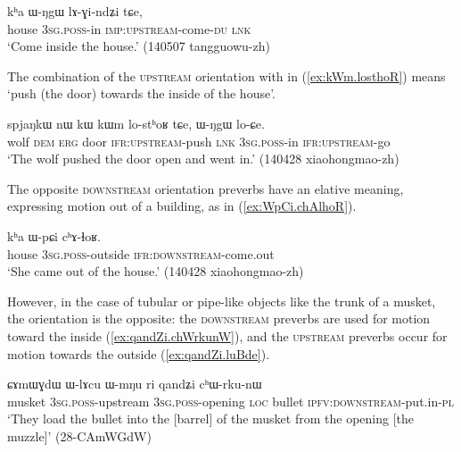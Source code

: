 \begin{exe}
\ex \label{ex:WNgW.lAGindZi}
\gll   kʰa ɯ-ŋgɯ lɤ-ɣi-ndʑi tɕe,   \\
  house  \textsc{3sg}.\textsc{poss}-in \textsc{imp}:\textsc{upstream}-come-\textsc{du} \textsc{lnk}   \\
\glt `Come inside the house.' (140507 tangguowu-zh) 
\end{exe}

The combination of the \textsc{upstream} orientation with  in (\ref{ex:kWm.losthoR}) means `push (the door) towards the inside of the house'.

\begin{exe}
\ex \label{ex:kWm.losthoR}
\gll spjaŋkɯ nɯ kɯ kɯm lo-stʰoʁ tɕe, ɯ-ŋgɯ lo-ɕe. \\
wolf \textsc{dem} \textsc{erg} door \textsc{ifr}:\textsc{upstream}-push \textsc{lnk} \textsc{3sg}.\textsc{poss}-in \textsc{ifr}:\textsc{upstream}-go \\
\glt `The wolf pushed the door open and went in.' (140428 xiaohongmao-zh)
\end{exe}

The  opposite \textsc{downstream} orientation preverbs have an elative meaning, expressing motion out of a building, as in (\ref{ex:WpCi.chAlhoR}).

\begin{exe}
\ex \label{ex:WpCi.chAlhoR}
\gll  kʰa ɯ-pɕi cʰɤ-ɬoʁ. \\
house \textsc{3sg}.\textsc{poss}-outside \textsc{ifr}:\textsc{downstream}-come.out \\
\glt `She came out of the house.' (140428 xiaohongmao-zh) 	
\end{exe}

However, in the case of tubular or pipe-like objects like the trunk of a musket, the orientation is the opposite: the \textsc{downstream} preverbs are used for motion toward the inside (\ref{ex:qandZi.chWrkunW}), and the \textsc{upstream} preverbs occur for motion towards the outside (\ref{ex:qandZi.luBde}).

\begin{exe}
\ex \label{ex:qandZi.chWrkunW}
\gll  ɕɤmɯɣdɯ ɯ-lɤcu ɯ-mŋu ri qandʑi cʰɯ-rku-nɯ \\
musket \textsc{3sg}.\textsc{poss}-upstream \textsc{3sg}.\textsc{poss}-opening \textsc{loc} bullet \textsc{ipfv}:\textsc{downstream}-put.in-\textsc{pl} \\
\glt `They load the bullet into the [barrel] of the musket from the opening [the muzzle]' (28-CAmWGdW) 
\end{exe}

